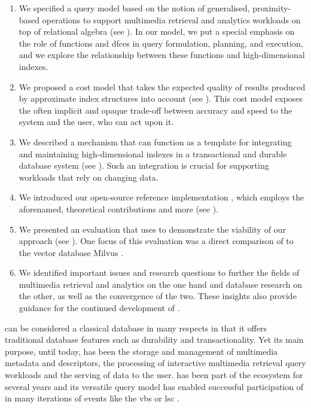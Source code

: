 \begin{enumerate}
    \item We specified a query model based on the notion of generalised, proximity-based operations to support multimedia retrieval and analytics workloads on top of relational algebra (see ). In our model, we put a special emphasis on the role of functions and \acrlong{dfc}es in query formulation, planning, and execution, and we explore the relationship between these functions and high-dimensional indexes.
    \item We proposed a cost model that takes the expected quality of results produced by approximate index structures into account (see ). This cost model exposes the often implicit and opaque trade-off between accuracy and speed to the system and the user, who can act upon it.
    \item We described a mechanism that can function as a template for integrating and maintaining high-dimensional indexes in a transactional and durable database system (see ). Such an integration is crucial for supporting workloads that rely on changing data.
    \item We introduced our open-source reference implementation \cottontail{}, which employs the aforenamed, theoretical contributions and more (see ). 
    \item We presented an evaluation that uses \cottontail{} to demonstrate the viability of our approach (see ). One focus of this evaluation was a direct comparison of \cottontail{} to the vector database Milvus \cite{Wang:2021Milvus}.
    \item We identified important issues and research questions to further the fields of multimedia retrieval and analytics on the one hand and database research on the other, as well as the convergence of the two. These insights also provide guidance for the continued development of \cottontail{}.
\end{enumerate}

\cottontail{} can be considered a classical database in many respects in that it offers traditional database features such as durability and transactionality. Yet its main purpose, until today, has been the storage and management of multimedia metadata and descriptors, the processing of interactive multimedia retrieval query workloads and the serving of data to the user. \cottontail{} has been part of the \vitrivr{} ecosystem \cite{Rossetto:2016Vitrivr,Gasser:2019Multimodal} for several years and its versatile query model has enabled successful participation of \vitrivr{} in many iterations of events like the \acrshort{vbs} \cite{Rossetto:2019Deep,Sauter:2020Combining,Spiess:2021Competitive,Heller:2022Multi} or \acrshort{lsc} \cite{Spiess:2021Exploring,Heller:2020Interactive,Heller:2021Interactive,Spiess:2022Multi}.

